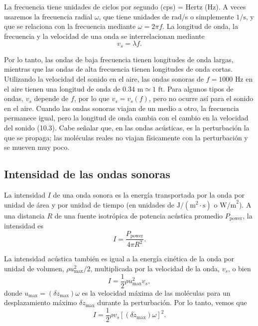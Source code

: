 \documentclass[12pt]{book}
\begin{document}
La frecuencia tiene unidades de ciclos por segundo (cps) = Hertz (Hz). A veces usaremos la frecuencia radial $\omega$, que tiene unidades de rad/s o simplemente $1/\text{s}$, y que se relaciona con la frecuencia mediante $\omega = 2\pi f$. La longitud de onda, la frecuencia y la velocidad de una onda se interrelacionan mediante
\begin{equation}
v_s = \lambda f.
\label{eq:10.3}
\end{equation}

Por lo tanto, las ondas de baja frecuencia tienen longitudes de onda largas, mientras que las ondas de alta frecuencia tienen longitudes de onda cortas. Utilizando la velocidad del sonido en el aire, las ondas sonoras de $f = 1000\text{ Hz}$ en el aire tienen una longitud de onda de $0.34\text{ m} \simeq 1\text{ ft}$. Para algunos tipos de ondas, $v_s$ depende de $f$, por lo que $v_s = v_s(f)$, pero no ocurre así para el sonido en el aire. Cuando las ondas sonoras viajan de un medio a otro, la frecuencia permanece igual, pero la longitud de onda cambia con el cambio en la velocidad del sonido (10.3). Cabe señalar que, en las ondas acústicas, es la perturbación la que se propaga; las moléculas reales no viajan físicamente con la perturbación y se mueven muy poco.


\subsection{Intensidad de las ondas sonoras}

La intensidad $I$ de una onda sonora es la energía transportada por la onda por unidad de área y por unidad de tiempo (en unidades de $\text{J/}(\text{m}^2\cdot\text{s})$ o $\text{W/m}^2$). A una distancia $R$ de una fuente isotrópica de potencia acústica promedio $P_{\text{power}}$, la intensidad es
\begin{equation}
I = \frac{P_{\text{power}}}{4\pi R^2}.
\label{eq:10.4}
\end{equation}

La intensidad acústica también es igual a la energía cinética de la onda por unidad de volumen, $\rho u_{\text{max}}^2 / 2$, multiplicada por la velocidad de la onda, $v_s$, o bien
\begin{equation}
I = \frac{1}{2}\rho u_{\text{max}}^2 v_s,
\label{eq:10.5}
\end{equation}
donde $u_{\text{max}} = (\delta z_{\text{max}})\omega$ es la velocidad máxima de las moléculas para un desplazamiento máximo $\delta z_{\text{max}}$ durante la perturbación. Por lo tanto, vemos que
\begin{equation}
I = \frac{1}{2}\rho v_s [(\delta z_{\text{max}})\omega]^2.
\label{eq:10.6}
\end{equation}
\end{document}
